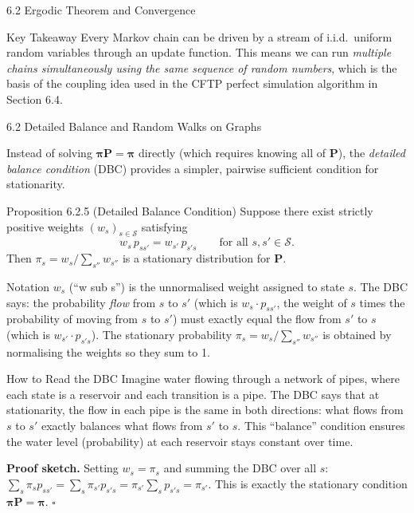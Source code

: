 \documentclass[aspectratio=169,10pt]{beamer}
\newcommand{\bfP}{\mathbf{P}}
\newcommand{\bfpi}{\bm{\pi}}
\begin{document}
\begin{frame}[allowframebreaks]{6.2 Ergodic Theorem and Convergence}
\begin{alertblock}{Key Takeaway}
Every Markov chain can be driven by a stream of i.i.d.\ uniform random variables through an update function.
This means we can run \emph{multiple chains simultaneously using the same sequence of random numbers}, which is the basis of the coupling idea used in the CFTP perfect simulation algorithm in Section 6.4.
\end{alertblock}

\end{frame}

\begin{frame}[allowframebreaks]{6.2 Detailed Balance and Random Walks on Graphs}

Instead of solving $\bfpi \bfP = \bfpi$ directly (which requires knowing all of $\bfP$), the \emph{detailed balance condition} (DBC) provides a simpler, pairwise sufficient condition for stationarity.

\begin{block}{Proposition 6.2.5 (Detailed Balance Condition)}
Suppose there exist strictly positive weights $(w_s)_{s \in \mathcal{S}}$ satisfying
\[
  w_s\, p_{ss'} = w_{s'}\, p_{s's} \qquad \text{for all } s, s' \in \mathcal{S}. \tag{DBC}
\]
Then $\pi_s = w_s / \sum_{s''} w_{s''}$ is a stationary distribution for $\bfP$.
\end{block}

\begin{block}{Notation}
$w_s$ (``w sub s'') is the unnormalised weight assigned to state $s$.
The DBC says: the probability \emph{flow} from $s$ to $s'$ (which is $w_s \cdot p_{ss'}$, the weight of $s$ times the probability of moving from $s$ to $s'$) must exactly equal the flow from $s'$ to $s$ (which is $w_{s'} \cdot p_{s's}$).
The stationary probability $\pi_s = w_s / \sum_{s''} w_{s''}$ is obtained by normalising the weights so they sum to 1.
\end{block}

\begin{alertblock}{How to Read the DBC}
Imagine water flowing through a network of pipes, where each state is a reservoir and each transition is a pipe.
The DBC says that at stationarity, the flow in each pipe is the same in both directions: what flows from $s$ to $s'$ exactly balances what flows from $s'$ to $s$.
This ``balance'' condition ensures the water level (probability) at each reservoir stays constant over time.
\end{alertblock}

\textbf{Proof sketch.}
Setting $w_s = \pi_s$ and summing the DBC over all $s$:
$\sum_s \pi_s p_{ss'} = \sum_s \pi_{s'} p_{s's} = \pi_{s'} \sum_s p_{s's} = \pi_{s'}$.
This is exactly the stationary condition $\bfpi \bfP = \bfpi$. $\square$


\end{frame}
\end{document}
